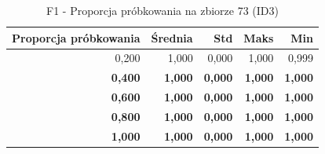 \begin{table}[htbp]
\centering
\small
\setlength{\tabcolsep}{6pt}
\renewcommand{\arraystretch}{1.2}
\caption{F1 - Proporcja próbkowania na zbiorze 73 (ID3)}
\label{tab:ID3_sample_ratio_73_f1}
\begin{tabular}{r|r|r|r|r}
\toprule
Proporcja próbkowania & Średnia & Std & Maks & Min \\
\hline
0,200 & 1,000 & 0,000 & 1,000 & 0,999 \\
\textbf{0,400} & \textbf{1,000} & \textbf{0,000} & \textbf{1,000} & \textbf{1,000} \\
\textbf{0,600} & \textbf{1,000} & \textbf{0,000} & \textbf{1,000} & \textbf{1,000} \\
\textbf{0,800} & \textbf{1,000} & \textbf{0,000} & \textbf{1,000} & \textbf{1,000} \\
\textbf{1,000} & \textbf{1,000} & \textbf{0,000} & \textbf{1,000} & \textbf{1,000} \\
\bottomrule
\end{tabular}
\end{table}